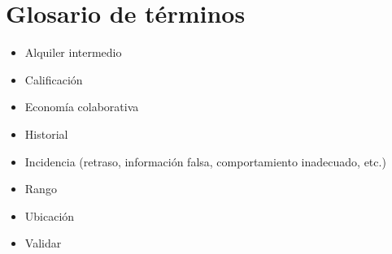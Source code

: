 \documentclass[11pt,spanish]{article} %
\begin{document}
\section{Glosario de términos}
\begin{itemize}
	\item Alquiler intermedio
	\item Calificación
	\item Economía colaborativa
	\item Historial
	\item Incidencia (retraso, información falsa, comportamiento inadecuado, etc.)
	\item Rango
	\item Ubicación
	\item Validar	
\end{itemize}







  

  
\end{document}
